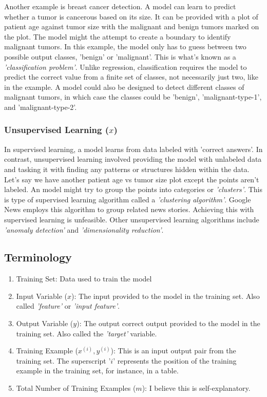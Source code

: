 \documentclass{article}
\begin{document}
Another example is breast cancer detection. A model can learn to predict whether a tumor is cancerous based on its size. It can be provided with a plot of patient age against tumor size with the malignant and benign tumors marked on the plot. The model might the attempt to create a boundary to identify malignant tumors. In this example, the model only has to guess between two possible output classes, 'benign' or 'malignant'. This is what's known as a \textit{'classification problem'}. Unlike regression, classification requires the model to predict the correct value from a finite set of classes, not necessarily just two, like in the example. A model could also be designed to detect different classes of malignant tumors, in which case the classes could be 'benign', 'malignant-type-1', and 'malignant-type-2'.

\subsubsection{Unsupervised Learning ($x$)}
In supervised learning, a model learns from data labeled with 'correct answers'. In contrast, unsupervised learning involved providing the model with unlabeled data and tasking it with finding any patterns or structures hidden within the data. Let's say we have another patient age vs tumor size plot except the points aren't labeled. An model might try to group the points into categories or \textit{'clusters'}. This is type of supervised learning algorithm called a \textit{'clustering algorithm'}. Google News employs this algorithm to group related news stories. Achieving this with supervised learning is unfeasible. Other unsupervised learning algorithms include \textit{'anomaly detection'} and \textit{'dimensionality reduction'}.

\subsection{Terminology}

\begin{enumerate}

\item Training Set: Data used to train the model
\item Input Variable ($x$): The input provided to the model in the training set. Also called \textit{'feature'} or \textit{'input feature'}.
\item Output Variable ($y$):  The output correct output provided to the model in the training set. Also called the \textit{'target'} variable.
\item Training Example ($x^{(i)}, y^{(i)}$): This is an input output pair from the training set. The superscript '$i$' represents the position of the training example in the training set, for instance, in a table.
\item Total Number of Training Examples ($m$): I believe this is self-explanatory.

\end{enumerate}
\end{document}
